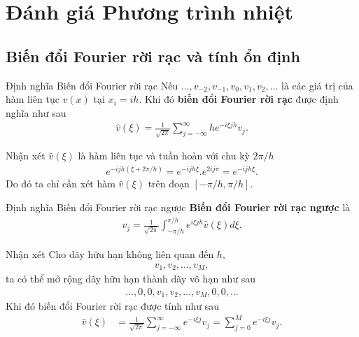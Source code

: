 \documentclass[9pt]{beamer}
\numberwithin{equation}{section}
\begin{document}
\section{Đánh giá Phương trình nhiệt}

\subsection{Biến đổi Fourier rời rạc và tính ổn định}

\begin{frame}
\begin{block}{Định nghĩa Biến đổi Fourier rời rạc}
Nếu $\ldots, v_{-2}, v_{-1}, v_0, v_1, v_2, \ldots$ là các giá trị của hàm liên tục $v(x)$ tại $x_i = ih$. Khi đó \textbf{biến đổi Fourier rời rạc} được định nghĩa như sau
\begin{align*}
    \hat{v}(\xi) = \frac{1}{\sqrt{2\pi}} \sum_{j=-\infty}^\infty h e^{-i\xi jh} v_j.
\end{align*}
\end{block}

\begin{exampleblock}{Nhận xét}
    $\hat{v}(\xi)$ là hàm liên tục và tuần hoàn với chu kỳ $2\pi/h$
    \begin{align*}
        e^{-ijh(\xi+2\pi/h)} = e^{-ijh\xi} . e^{2ij\pi} = e^{-ijh\xi}.
    \end{align*}
    Do đó ta chỉ cần xét hàm $\hat{v}(\xi)$ trên đoạn $[-\pi/h, \pi/h]$.
\end{exampleblock}
\end{frame}

\begin{frame}
\begin{block}{Định nghĩa Biến đổi Fourier rời rạc ngược}
    \textbf{Biến đổi Fourier rời rạc ngược} là
    \begin{align*}
        v_j = \frac{1}{\sqrt{2\pi}} \int_{-\pi/h}^{\pi/h} e^{i\xi jh} \hat{v}(\xi) d\xi.
    \end{align*}
\end{block}

\begin{exampleblock}{Nhận xét}
    Cho dãy hữu hạn không liên quan đến $h$,
    \begin{align*}
        v_1, v_2, \ldots, v_M,
    \end{align*}
    ta có thể mở rộng dãy hữu hạn thành dãy vô hạn như sau
    \begin{align*}
        \ldots, 0, 0, v_1, v_2, \ldots, v_M, 0, 0, \ldots
    \end{align*}
    Khi đó biến đổi Fourier rời rạc được tính như sau
    \begin{align*}
        \hat{v}(\xi) &= \frac{1}{\sqrt{2\pi}} \sum_{j=-\infty}^\infty e^{-i\xi j} v_j = \sum_{j=0}^M e^{-i\xi j} v_j.
    \end{align*}
\end{exampleblock}
\end{frame}
\end{document}

